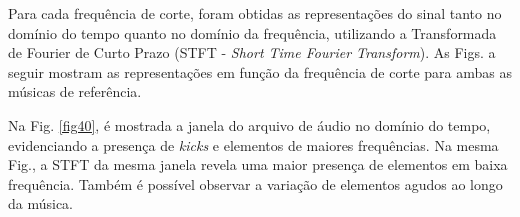 Para cada frequência de corte, foram obtidas as representações do sinal tanto no domínio do tempo quanto no domínio da frequência, utilizando a Transformada de Fourier de Curto Prazo (STFT - \textit{Short Time Fourier Transform}). 
As Figs. a seguir mostram as representações em função da frequência de corte para ambas as músicas de referência.

Na Fig. \ref{fig40}, é mostrada a janela do arquivo de áudio no domínio do tempo, evidenciando a presença de \textit{kicks} e elementos de maiores frequências. Na mesma Fig., a STFT da mesma janela revela uma maior presença de elementos em baixa frequência. Também é possível observar a variação de elementos agudos ao longo da música.


